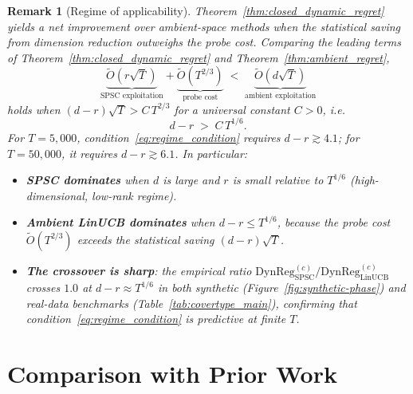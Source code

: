 \documentclass{article}
\newcommand{\DynReg}{\mathrm{DynReg}}
\newtheorem{remark}{Remark}
\begin{document}
 \begin{remark}[Regime of applicability]
  \label{rem:regime}
  Theorem~\ref{thm:closed_dynamic_regret} yields a net improvement over ambient-space methods when the statistical saving from
  dimension reduction outweighs the probe cost. Comparing the leading terms of Theorem~\ref{thm:closed_dynamic_regret} and
  Theorem~\ref{thm:ambient_regret},
  \[
    \underbrace{\widetilde{O}(r\sqrt{T})}_{\text{SPSC exploitation}}
    +
    \underbrace{\widetilde{O}(T^{2/3})}_{\text{probe cost}}
    \;<\;
    \underbrace{\widetilde{O}(d\sqrt{T})}_{\text{ambient exploitation}}
  \]
  holds when $(d-r)\sqrt{T} > C\,T^{2/3}$ for a universal constant $C>0$, i.e.\
  \begin{equation}
    d - r \;>\; C\,T^{1/6}.
    \label{eq:regime_condition}
  \end{equation}
  For $T = 5{,}000$, condition~\eqref{eq:regime_condition} requires $d - r \gtrsim 4.1$; for $T = 50{,}000$, it requires $d - r
  \gtrsim 6.1$. In particular:
  \begin{itemize}[nosep]
    \item \textbf{SPSC dominates} when $d$ is large and $r$ is small relative to $T^{1/6}$ (high-dimensional, low-rank regime).
    \item \textbf{Ambient LinUCB dominates} when $d - r \leq T^{1/6}$, because the probe cost $\widetilde{O}(T^{2/3})$ exceeds the
  statistical saving $(d-r)\sqrt{T}$.
    \item \textbf{The crossover is sharp}: the empirical ratio $\DynReg^{(c)}_{\mathrm{SPSC}}/\DynReg^{(c)}_{\mathrm{LinUCB}}$
  crosses $1.0$ at $d - r \approx T^{1/6}$ in both synthetic (Figure~\ref{fig:synthetic-phase}) and real-data benchmarks
  (Table~\ref{tab:covertype_main}), confirming that condition~\eqref{eq:regime_condition} is predictive at finite $T$.
  \end{itemize}
  \end{remark}


\section{Comparison with Prior Work}
\label{app:related_table}
\end{document}

